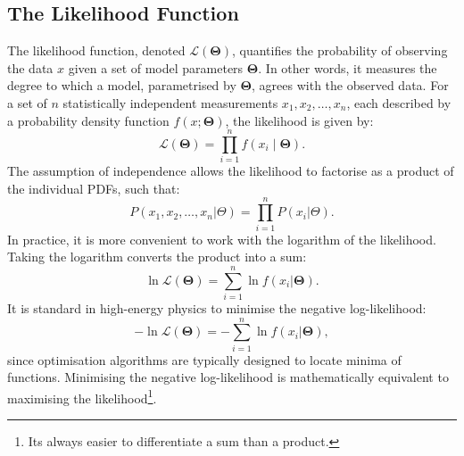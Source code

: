 \subsection{The Likelihood Function}
The likelihood function, denoted $\mathcal{L}(\boldsymbol{\Theta})$, quantifies the probability of observing the data $x$ given a set of model parameters $\boldsymbol{\Theta}$. In other words, it measures the degree to which a model, parametrised by $\boldsymbol{\Theta}$, agrees with the observed data. For a set of $n$ statistically independent measurements $x_1, x_2, \dots, x_n$, each described by a probability density function $f(x;\boldsymbol{\Theta})$, the likelihood is given by:
\begin{equation}
\mathcal{L}(\boldsymbol{\Theta}) = \prod_{i=1}^n f(x_i \;|\; \boldsymbol{\Theta}).
\end{equation}
The assumption of independence allows the likelihood to factorise as a product of the individual PDFs, such that:
\begin{equation}
    P(x_1, x_2, \dots, x_n | \Theta) 
= \prod_{i=1}^n P(x_i | \Theta).
\end{equation}
In practice, it is more convenient to work with the logarithm of the likelihood. Taking the logarithm converts the product into a sum:
\begin{equation}
\ln \mathcal{L}(\boldsymbol{\Theta}) = \sum_{i=1}^n \ln f(x_i | \boldsymbol{\Theta}).
\end{equation}
It is standard in high-energy physics to minimise the negative log-likelihood:
\begin{equation}
-\ln \mathcal{L}(\boldsymbol{\Theta}) = - \sum_{i=1}^n \ln f(x_i| \boldsymbol{\Theta}),
\end{equation}
since optimisation algorithms are typically designed to locate minima of functions. Minimising the negative log-likelihood is mathematically equivalent to maximising the likelihood\footnote{Its always easier to differentiate a sum than a product.}.
